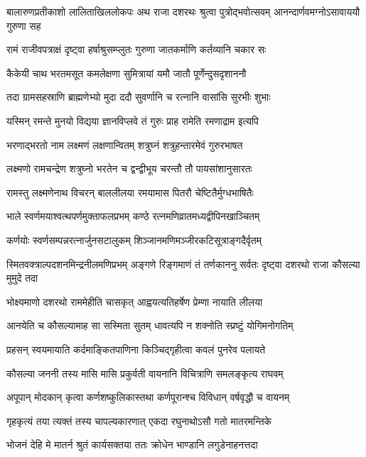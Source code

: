 \threelineshloka
{बालारुणप्रतीकाशो लालिताखिललोकपः}
{अथ राजा दशरथः श्रुत्वा पुत्रोद्भवोत्सवम्}
{आनन्दार्णवमग्नोऽसावाययौ गुरुणा सह} %

\twolineshloka
{रामं राजीवपत्राक्षं दृष्ट्वा हर्षाश्रुसम्प्लुतः}
{गुरुणा जातकर्माणि कर्तव्यानि चकार सः} %

\twolineshloka
{कैकेयी चाथ भरतमसूत कमलेक्षणा}
{सुमित्रायां यमौ जातौ पूर्णेन्दुसदृशाननौ} %

\twolineshloka
{तदा ग्रामसहस्राणि ब्राह्मणेभ्यो मुदा ददौ}
{सुवर्णानि च रत्नानि वासांसि सुरभीः शुभाः} %

\twolineshloka
{यस्मिन् रमन्ते मुनयो विद्यया ज्ञानविप्लवे}
{तं गुरुः प्राह रामेति रमणाद्राम इत्यपि} %

\twolineshloka
{भरणाद्भरतो नाम लक्ष्मणं लक्षणान्वितम्}
{शत्रुघ्नं शत्रुहन्तारमेवं गुरुरभाषत} %

\twolineshloka
{लक्ष्मणो रामचन्द्रेण शत्रुघ्नो भरतेन च}
{द्वन्द्वीभूय चरन्तौ तौ पायसांशानुसारतः} %

\twolineshloka
{रामस्तु लक्ष्मणेनाथ विचरन् बाललीलया}
{रमयामास पितरौ चेष्टितैर्मुग्धभाषितैः} %

\twolineshloka
{भाले स्वर्णमयाश्वत्थपर्णमुक्ताफलप्रभम्}
{कण्ठे रत्नमणिव्रातमध्यद्वीपिनखाञ्चितम्} %

\twolineshloka
{कर्णयोः स्वर्णसम्पन्नरत्नार्जुनसटालुकम्}
{शिञ्जानमणिमञ्जीरकटिसूत्राङ्गदैर्वृतम्} %

\threelineshloka
{स्मितवक्त्राल्पदशनमिन्द्रनीलमणिप्रभम्}
{अङ्गणे रिङ्गमाणं तं तर्णकाननु सर्वतः}
{दृष्ट्वा दशरथो राजा कौसल्या मुमुदे तदा} %

\twolineshloka
{भोक्ष्यमाणो दशरथो राममेहीति चासकृत्}
{आह्वयत्यतिहर्षेण प्रेम्णा नायाति लीलया} %

\twolineshloka
{आनयेति च कौसल्यामाह सा सस्मिता सुतम्}
{धावत्यपि न शक्नोति स्प्रष्टुं योगिमनोगतिम्} %

\twolineshloka
{प्रहसन् स्वयमायाति कर्दमाङ्कितपाणिना}
{किञ्चिद्गृहीत्वा कवलं पुनरेव पलायते} %

\twolineshloka
{कौसल्या जननी तस्य मासि मासि प्रकुर्वती}
{वायनानि विचित्राणि समलङ्कृत्य राघवम्} %

\twolineshloka
{अपूपान् मोदकान् कृत्वा कर्णशष्कुलिकास्तथा}
{कर्णपूरान्श्च विविधान् वर्षवृद्धौ च वायनम्} %

\twolineshloka
{गृहकृत्यं तया त्यक्तं तस्य चापल्यकारणात्}
{एकदा रघुनाथोऽसौ गतो मातरमन्तिके} %

\twolineshloka
{भोजनं देहि मे मातर्न श्रुतं कार्यसक्तया}
{ततः क्रोधेन भाण्डानि लगुडेनाहनत्तदा} %

